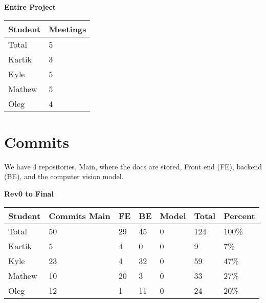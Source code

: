 \documentclass{article}
\begin{document}
\begin{table}[H]
\centering
\textbf{Entire Project}\\
\begin{tabular}{ll}
\toprule
\textbf{Student} & \textbf{Meetings}\\
\midrule
Total & 5\\
Kartik & 3\\
Kyle   & 5\\
Mathew & 5\\
Oleg   & 4\\
\bottomrule
\end{tabular}
\end{table}


\section{Commits}

We have 4 repositories, Main, where the docs are stored, Front end (FE), backend (BE), and the computer vision model.
\begin{table}[H]
    \centering
    \textbf{Rev0 to Final}\\
    \begin{tabular}{lllllll}
    \toprule
    \textbf{Student} & \textbf{Commits Main} & \textbf{FE} & \textbf{BE} & \textbf{Model} & \textbf{Total}& \textbf{Percent}\\
    \midrule
    Total & 50 & 29 & 45 & 0 & 124 & 100\% \\
    Kartik & 5 & 4 & 0 & 0 & 9 & 7\%\\
    Kyle   & 23 & 4 & 32 & 0 & 59 & 47\%\\
    Mathew & 10 & 20 & 3 & 0 & 33 & 27\% \\
    Oleg   & 12 &  1 & 11 & 0 & 24 & 20\% \\
    \bottomrule
    \end{tabular}
\end{table}
\end{document}
